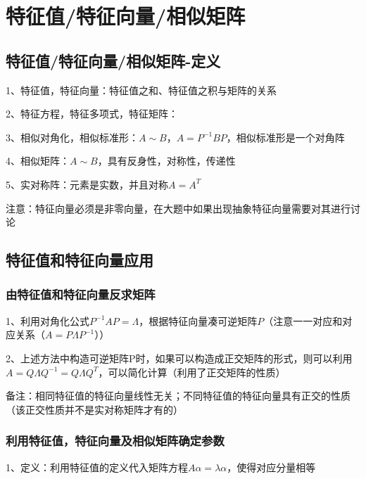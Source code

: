 \chapter{特征值/特征向量/相似矩阵}

\section{特征值/特征向量/相似矩阵-定义}

1、特征值，特征向量：特征值之和、特征值之积与矩阵的关系

2、特征方程，特征多项式，特征矩阵：

3、相似对角化，相似标准形：$A \sim B$，$A=P^{-1}BP$，相似标准形是一个对角阵

4、相似矩阵：$A \sim B$，具有反身性，对称性，传递性

5、实对称阵：元素是实数，并且对称$A=A^T$

注意：特征向量必须是非零向量，在大题中如果出现抽象特征向量需要对其进行讨论

\section{特征值和特征向量应用}



\subsection{由特征值和特征向量反求矩阵}

1、利用对角化公式$P^{-1}AP=\Lambda$，根据特征向量凑可逆矩阵$P$（注意一一对应和对应关系（$A=P\Lambda P^{-1}$））

2、上述方法中构造可逆矩阵P时，如果可以构造成正交矩阵的形式，则可以利用$A=Q\Lambda Q^{-1}=Q\Lambda Q^{T}$，可以简化计算（利用了正交矩阵的性质）

备注：相同特征值的特征向量线性无关；不同特征值的特征向量具有正交的性质（该正交性质并不是实对称矩阵才有的）



\subsection{利用特征值，特征向量及相似矩阵确定参数}

1、定义：利用特征值的定义代入矩阵方程$A\alpha=\lambda \alpha$，使得对应分量相等



